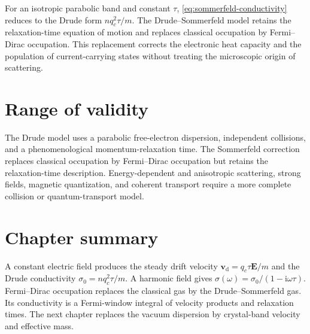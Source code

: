 For an isotropic parabolic band and constant $\tau$,
\cref{eq:sommerfeld-conductivity} reduces to the Drude form
$nq_c^2\tau/m$.  The Drude--Sommerfeld model retains the relaxation-time
equation of motion and replaces classical occupation by Fermi--Dirac
occupation.  This replacement corrects the electronic heat capacity and the
population of current-carrying states without treating the microscopic origin
of scattering.

\section{Range of validity}

The Drude model uses a parabolic free-electron dispersion, independent
collisions, and a phenomenological momentum-relaxation time.  The Sommerfeld
correction replaces classical occupation by Fermi--Dirac occupation but retains
the relaxation-time description.  Energy-dependent and anisotropic scattering,
strong fields, magnetic quantization, and coherent transport require a more
complete collision or quantum-transport model.

\section{Chapter summary}

A constant electric field produces the steady drift velocity
$\bm v_{\mathrm d}=q_c\tau\bm E/m$ and the Drude conductivity
$\sigma_0=nq_c^2\tau/m$.  A harmonic field gives
$\sigma(\omega)=\sigma_0/(1-\mathrm i\omega\tau)$.  Fermi--Dirac occupation
replaces the classical gas by the Drude--Sommerfeld gas.  Its conductivity is a
Fermi-window integral of velocity products and relaxation times.  The next
chapter replaces the vacuum dispersion by crystal-band velocity and effective
mass.
